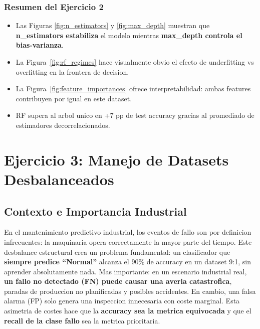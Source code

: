 \documentclass[12pt,a4paper]{article}
\begin{document}
\subsubsection*{Resumen del Ejercicio 2}

\begin{tcolorbox}[resultbox, title={Conclusiones Ejercicio 2 -- Random Forest}]
  \begin{itemize}
    \item Las Figuras \ref{fig:n_estimators} y \ref{fig:max_depth} muestran que \textbf{n\_estimators
      estabiliza} el modelo mientras \textbf{max\_depth controla el bias-varianza}.
    \item La Figura~\ref{fig:rf_regimes} hace visualmente obvio el efecto de underfitting vs
      overfitting en la frontera de decision.
    \item La Figura~\ref{fig:feature_importances} ofrece interpretabilidad: ambas features
      contribuyen por igual en este dataset.
    \item RF supera al arbol unico en +7 pp de test accuracy gracias al promediado de
      estimadores decorrelacionados.
  \end{itemize}
\end{tcolorbox}

\newpage

\section{Ejercicio 3: Manejo de Datasets Desbalanceados}

\subsection{Contexto e Importancia Industrial}

\begin{tcolorbox}[porquebox, title={Por que el desbalance de clases es critico en mantenimiento predictivo?}]
En el mantenimiento predictivo industrial, los eventos de fallo son por definicion infrecuentes:
la maquinaria opera correctamente la mayor parte del tiempo. Este desbalance estructural crea un
problema fundamental: un clasificador que \textbf{siempre predice ``Normal''} alcanza el 90\%
de accuracy en un dataset 9:1, sin aprender absolutamente nada. Mas importante: en un escenario
industrial real, \textbf{un fallo no detectado (FN) puede causar una averia catastrofica},
paradas de produccion no planificadas y posibles accidentes. En cambio, una falsa alarma (FP)
solo genera una inspeccion innecesaria con coste marginal. Esta asimetria de costes hace que la
\textbf{accuracy sea la metrica equivocada} y que el \textbf{recall de la clase fallo} sea la
metrica prioritaria.
\end{tcolorbox}
\end{document}
